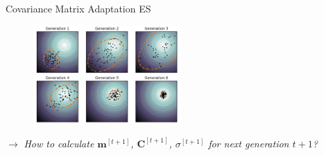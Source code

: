 \documentclass[11pt,compress,t,notes=noshow, xcolor=table]{beamer}
\begin{document}
\begin{vbframe}{Covariance Matrix Adaptation ES}
\begin{figure}
  \includegraphics[width=0.5\textwidth]{figure_man/cmaes/cmaes_generations.png}
\end{figure}


$\rightarrow$ \textit{How to calculate $\bm{m}^{[t+1]}$, $\bm{C}^{[t+1]}$, $\sigma^{[t+1]}$ for next generation $t+1$?}
\end{vbframe}






\end{document}
